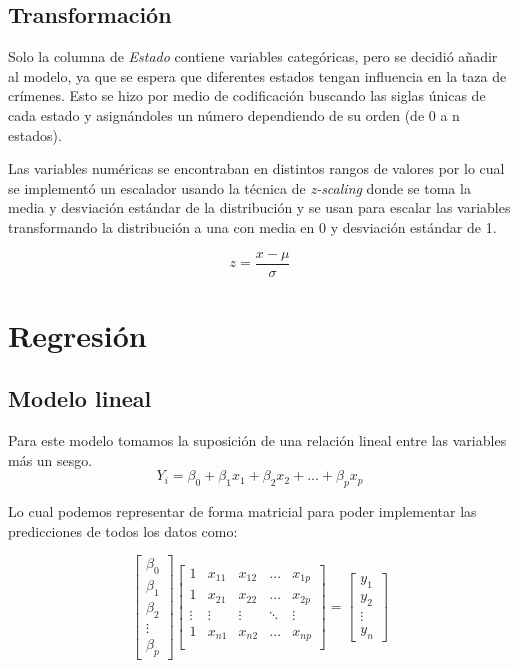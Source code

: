 \documentclass[twocolumn]{article}
\begin{document}
\subsection{Transformación}
Solo la columna de \textit{Estado} contiene variables categóricas, pero se decidió
añadir al modelo, ya que se espera que diferentes estados tengan influencia en 
la taza de crímenes. Esto se hizo por medio de codificación buscando las siglas 
únicas de cada estado y asignándoles un número dependiendo de su orden (de 0 a n estados).

Las variables numéricas se encontraban en distintos rangos de valores por lo cual 
se implementó un escalador usando la técnica de \textit{z-scaling} donde se toma 
la media y desviación estándar de la distribución y se usan para escalar las variables 
transformando la distribución a una con media en 0 y desviación estándar de 1.

\begin{equation}
  z = \frac{x - \mu}{\sigma}
\end{equation}

\section{Regresión}
\subsection{Modelo lineal}
Para este modelo tomamos la suposición de una relación lineal entre las variables
más un sesgo.
\begin{equation}
  Y_i = \beta_0 + \beta_1x_1 + \beta_2x_2 + ... + \beta_px_p
\end{equation}

Lo cual podemos representar de forma matricial para poder implementar las predicciones 
de todos los datos como:

\begin{equation}
  \begin{bmatrix}
    \beta_0 \\
    \beta_1 \\
    \beta_2 \\
    \vdots  \\
    \beta_p
  \end{bmatrix}
  \begin{bmatrix}
    1 & x_{11} & x_{12} & ... & x_{1p} \\
    1 & x_{21} & x_{22} & ... & x_{2p} \\
    \vdots & \vdots & \vdots & \ddots & \vdots \\
    1 & x_{n1} & x_{n2} & ... & x_{np} \\
  \end{bmatrix}
  =
  \begin{bmatrix}
    y_1 \\
    y_2 \\
    \vdots  \\
    y_n
  \end{bmatrix}
\end{equation}
\end{document}
